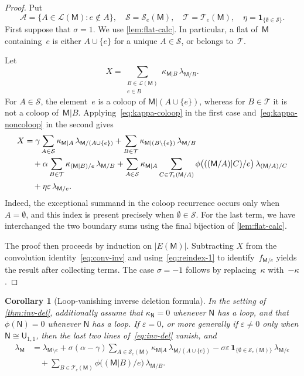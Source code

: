 \documentclass[12pt,letterpaper,english]{amsart}
\theoremstyle{teoremas}
\newtheorem{corollary}[theorem]{Corollary}
\theoremstyle{definition}
\newcommand{\M}{\mathsf{M}}
\newcommand{\N}{\mathsf{N}}
\newcommand{\U}{\mathsf{U}}
\newcommand{\Se}{\mathcal{S}_e}
\newcommand{\Te}{\mathcal{T}_e}
\begin{document}
\begin{proof}
Put
\[
\mathcal{A} = \{A \in \mathcal{L}(\M) : e \notin A\},\quad
\mathcal{S} = \Se(\M),\quad
\mathcal{T} = \Te(\M),\quad
\eta = \mathbf{1}_{\{\emptyset \in \mathcal{S}\}}.
\]
First suppose that $\sigma = 1$.
We use \cref{lem:flat-calc}.  In particular, a flat of~$\M$ containing~$e$
is either $A \cup \{e\}$ for a unique $A \in \mathcal{S}$, or belongs
to~$\mathcal{T}$.

Let
\[
X = \sum_{\substack{B \in \mathcal{L}(\M) \\ e \in B}}
  \kappa_{\M|B}\, \lambda_{\M/B}.
\]
For $A \in \mathcal{S}$, the element~$e$ is a coloop of
$\M|(A \cup \{e\})$, whereas for $B \in \mathcal{T}$ it is not a coloop
of~$\M|B$.
Applying~\eqref{eq:kappa-coloop} in the first case
and~\eqref{eq:kappa-noncoloop} in the second gives
\begin{align}
X &= \gamma \sum_{A \in \mathcal{S}}
    \kappa_{\M|A}\, \lambda_{\M/(A \cup \{e\})}
  + \sum_{B \in \mathcal{T}}
    \kappa_{\M|(B \setminus \{e\})}\, \lambda_{\M/B}
    \notag \\
&\quad + \alpha \sum_{B \in \mathcal{T}}
    \kappa_{(\M|B)/e}\, \lambda_{\M/B}
  + \sum_{A \in \mathcal{S}} \kappa_{\M|A}
    \sum_{C \in \Te(\M/A)}
    \phi\bigl(((\M/A)|C)/e\bigr)\, \lambda_{(\M/A)/C}
    \notag \\
&\quad + \eta \varepsilon\, \lambda_{\M/e}.
    \label{eq:X-inv}
\end{align}
Indeed, the exceptional summand in the coloop recurrence occurs only
when $A = \emptyset$, and this index is present precisely when
$\emptyset \in \mathcal{S}$.  For the last term, we have interchanged
the two boundary sums using the final bijection of \cref{lem:flat-calc}.

The proof then proceeds by induction on $|E(\M)|$.
Subtracting $X$ from the convolution identity~\eqref{eq:conv-inv}
and using~\eqref{eq:reindex-1} to identify~$f_{\M/e}$ yields the
result after collecting terms.
The case $\sigma = -1$ follows by replacing~$\kappa$ with~$-\kappa$.
\end{proof}

\begin{corollary}[Loop-vanishing inverse deletion formula]
\label{cor:inv-loop-vanish}
In the setting of \cref{thm:inv-del}, additionally assume that
$\kappa_{\N} = 0$ whenever $\N$ has a loop, and that $\phi(\N) = 0$
whenever $\N$ has a loop.
If $\varepsilon = 0$, or more generally if
$\varepsilon \neq 0$ only when $\N \cong \U_{1,1}$, then the last two lines
of~\eqref{eq:inv-del} vanish, and
\begin{align*}
\lambda_{\M} &= \lambda_{\M \setminus e}
  + \sigma(\alpha - \gamma) \sum_{A \in \Se(\M)}
    \kappa_{\M|A}\, \lambda_{\M/(A \cup \{e\})}
  - \sigma\varepsilon\, \mathbf{1}_{\{\emptyset \in \Se(\M)\}}\,
    \lambda_{\M/e} \\
&\quad + \sum_{B \in \Te(\M)}
    \phi\bigl((\M|B)/e\bigr)\, \lambda_{\M/B}.
\end{align*}
\end{corollary}
\end{document}
